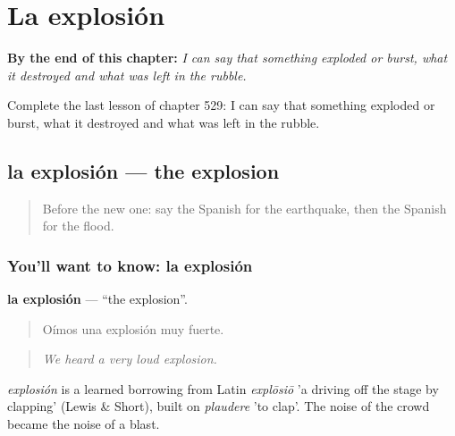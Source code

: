 
\chapter{La explosión}
\label{ch:es-la-explosion}

\begin{chapteropening}
\textbf{By the end of this chapter:} \emph{I can say that something exploded or burst, what it destroyed and what was left in the rubble.}

Complete the last lesson of chapter 529: I can say that something exploded or burst, what it destroyed and what was left in the rubble.
\end{chapteropening}

\section[la explosión]{la explosión — the explosion}

\label{lesson:ES-C529-explosion}



\begin{quote}
Before the new one: say the Spanish for the earthquake, then the Spanish for the flood.
\end{quote}

\subsection*{You'll want to know: la explosión}
\textbf{la explosión} — \textquotedblleft{}the explosion\textquotedblright{}.

\begin{quote}
Oímos una explosión muy fuerte.
\end{quote}

\begin{quote}
\emph{We heard a very loud explosion.}
\end{quote}

\begin{cousinweb}
\emph{explosión} is a learned borrowing from Latin \emph{explōsiō} 'a driving off the stage by clapping' (Lewis \& Short), built on \emph{plaudere} 'to clap'. The noise of the crowd became the noise of a blast.
\end{cousinweb}

